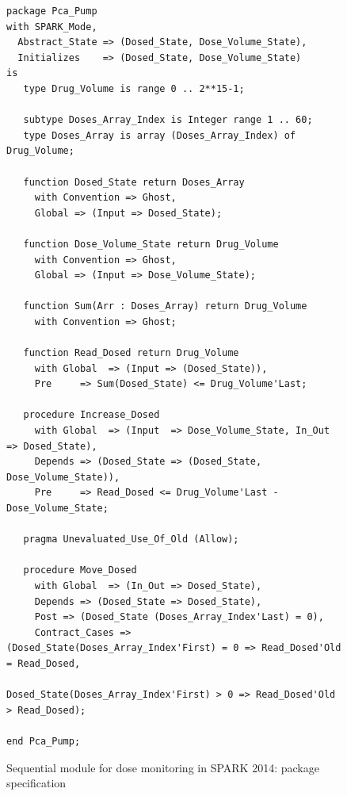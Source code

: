 \begin{figure}
\singlespacing
\begin{lstlisting}[language=ada2012, frame=single, gobble=0]
package Pca_Pump
with SPARK_Mode,
  Abstract_State => (Dosed_State, Dose_Volume_State),
  Initializes    => (Dosed_State, Dose_Volume_State)
is
   type Drug_Volume is range 0 .. 2**15-1;

   subtype Doses_Array_Index is Integer range 1 .. 60;
   type Doses_Array is array (Doses_Array_Index) of Drug_Volume;

   function Dosed_State return Doses_Array
     with Convention => Ghost,
     Global => (Input => Dosed_State);

   function Dose_Volume_State return Drug_Volume
     with Convention => Ghost,
     Global => (Input => Dose_Volume_State);

   function Sum(Arr : Doses_Array) return Drug_Volume
     with Convention => Ghost;

   function Read_Dosed return Drug_Volume
     with Global  => (Input => (Dosed_State)),
     Pre     => Sum(Dosed_State) <= Drug_Volume'Last;

   procedure Increase_Dosed
     with Global  => (Input  => Dose_Volume_State, In_Out => Dosed_State),
     Depends => (Dosed_State => (Dosed_State, Dose_Volume_State)),
     Pre     => Read_Dosed <= Drug_Volume'Last - Dose_Volume_State;

   pragma Unevaluated_Use_Of_Old (Allow);

   procedure Move_Dosed
     with Global  => (In_Out => Dosed_State),
     Depends => (Dosed_State => Dosed_State),
     Post => (Dosed_State (Doses_Array_Index'Last) = 0),
     Contract_Cases => (Dosed_State(Doses_Array_Index'First) = 0 => Read_Dosed'Old = Read_Dosed,
                        Dosed_State(Doses_Array_Index'First) > 0 => Read_Dosed'Old > Read_Dosed);
     
end Pca_Pump;
\end{lstlisting}
\doublespacing
\caption{Sequential module for dose monitoring in SPARK 2014: package specification}
\label{listing:pca_pump_move_dosed_unit_spark2014_spec}
\end{figure}


